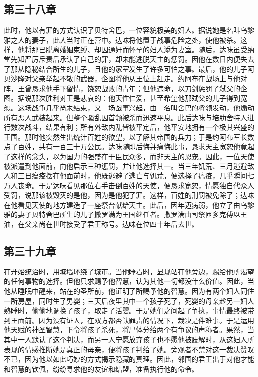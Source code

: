 
\subsection{第三十八章}

此时，他以有罪的方式认识了贝特舍巴，一位容貌极美的妇人。据说她是名叫乌黎雅之人的妻子，此人当时正在营中。达味将他置于战事危险之处，使他被杀。这样，他将那已脱离婚姻束缚、却因通奸而怀孕的妇人添为妻室。随后，达味虽受纳堂先知严厉斥责后承认了自己的罪，却未能逃脱天主的惩罚。因他在数日内便失去了那从隐秘结合所生的儿子，且他的家室发生了许多可怕之事。最后，他的儿子阿贝沙隆对父亲举起不敬的武器，企图将他从王位上赶走。约阿布在战场上与他对阵，王曾恳求他手下留情，饶恕战败的青年；但他违命，以刀剑惩罚了弑父的企图。据说那次胜利对王是悲哀的：他天性仁爱，甚至希望他那弑父的儿子得到宽恕。这场战争几乎尚未结束，又一场战事兴起，由一名叫舍巴的将领发动，他煽动所有恶人武装起来。但整个骚乱因首领被杀而迅速平息。此后达味与培肋舍特人进行数次战斗，结果有利；所有外敌内乱皆被平定后，他平安地拥有一个极其兴盛的王国。那时他突然生出统计百姓的欲望，以了解其帝国的兵力；于是约阿布军长数点了百姓，共有一百三十万公民。达味随即后悔并痛悔此事，恳求天主宽恕他竟起了这样的念头，以为国力的强盛在于臣民众多，而非天主的恩宠。因此，一位天使被派遣到他面前，向他启示三种惩罚，并让他选择其一。当三年饥荒、三月逃避敌人和三日瘟疫摆在他面前时，他既逃避了逃亡与饥荒，便选择了瘟疫，几乎瞬间七万人丧命。于是达味看见那位右手击倒百姓的天使，便恳求宽恕，情愿独自代众人受罚，说那该被毁灭的是他，因为是他犯了罪。这样，百姓的刑罚被免除了；达味在他看见天使的地方建造了一座祭台献给天主。此后，因年迈病弱，他立了由乌黎雅的妻子贝特舍巴所生的儿子撒罗满为王国继任者。撒罗满由司祭匝多克傅以王油，在父亲尚在世时接受了君王称号。达味在位四十年后去世。\par


\subsection{第三十九章}

在开始统治时，用城墙环绕了城市。当他睡着时，显现站在他旁边，赐给他所渴望的任何事物的选择。但他只求赐予他智慧，认为其他一切都没什么价值。因此，当他从睡眠中醒来，站在的圣所前，他证明了所赐予他的智慧。因为有两个妇人同住一所房屋，同时生了男婴；三天后夜里其中一个孩子死了，死婴的母亲趁另一妇人熟睡时，偷偷地调换了孩子，取走了活婴。于是她们之间起了争执，事情最终被带到王面前。因为没有证人，在双方都否认罪责的情况下，裁决是件难事。于是运用他天赋的神圣智慧，下令将孩子杀死，将尸体分给两个有争议的声称者。果然，当其中一人默认了这个判决，而另一人宁愿放弃孩子也不愿他被肢解时，从这妇人所表现的情感推断她是真正的母亲，便将孩子判给了她。旁观者不禁对这一裁决赞叹不已，因为他以如此巧妙的方式揭示隐藏的真理。因此，邻国的君王出于对他才能和智慧的钦佩，纷纷寻求他的友谊和结盟，准备执行他的命令。\par

